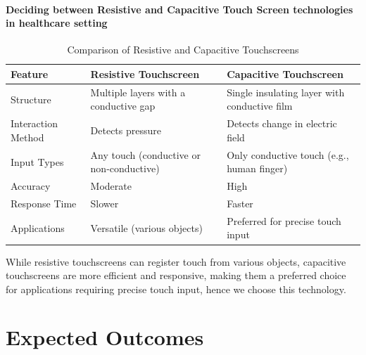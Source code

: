 \documentclass{article}
\begin{document}
\paragraph{Deciding between Resistive and Capacitive Touch Screen
technologies in healthcare
setting}\label{deciding-between-resistive-and-capacitive-touch-screen-technologies-in-healthcare-setting}

\begin{table}[h]
    \centering
    \caption{Comparison of Resistive and Capacitive Touchscreens}
    \begin{tabular}{@{}lll@{}}
        \toprule
        Feature                  & Resistive Touchscreen                      & Capacitive Touchscreen                     \\ \midrule
        Structure                & Multiple layers with a conductive gap      & Single insulating layer with conductive film \\ 
        Interaction Method       & Detects pressure                           & Detects change in electric field           \\
        Input Types              & Any touch (conductive or non-conductive)  & Only conductive touch (e.g., human finger)  \\
        Accuracy                 & Moderate                                  & High                                      \\
        Response Time            & Slower                                    & Faster                                    \\ 
        Applications             & Versatile (various objects)               & Preferred for precise touch input          \\ \bottomrule
    \end{tabular}
\end{table}

While resistive touchscreens can register touch from various objects,
capacitive touchscreens are more efficient and responsive, making them a
preferred choice for applications requiring precise touch input, hence
we choose this technology.

\section{Expected Outcomes}\label{expected-outcomes}
\end{document}
